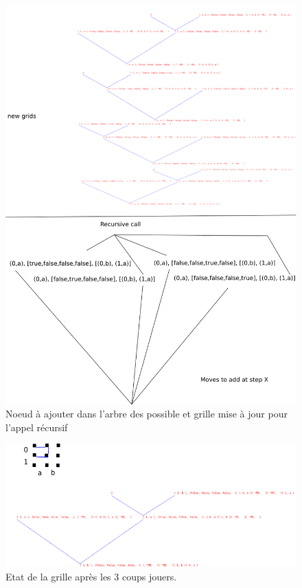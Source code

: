 \documentclass[a4paper,12pt]{report}
\begin{document}
\begin{figure}[p]
	\includegraphics[width=15cm]{images/move_tree_updategrid.png}
	\caption{\label{arbre_possible_updategrid}Noeud \`a ajouter dans l'arbre des possible et grille mise \`a jour pour l'appel r\'ecursif}
\end{figure}

\begin{figure}[p]
	\includegraphics[width=15cm]{images/initialstateplay.png}
	\caption{\label{conf_initiale_jeu}Etat de la grille apr\`es les 3 coups jouers.}
\end{figure}
\end{document}
